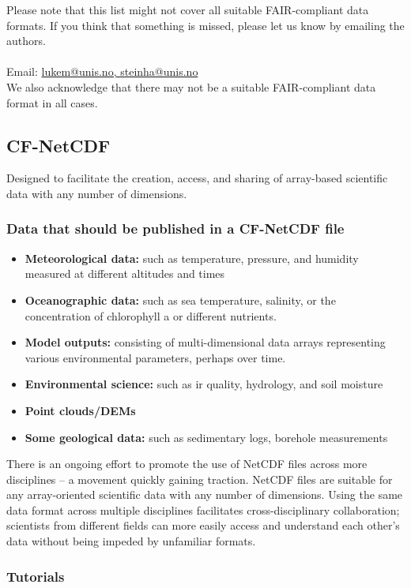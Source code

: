 \documentclass[a4paper,12pt]{article}
\makeatletter
\newcommand{\emailauthors}{\href{mailto:lukem@unis.no,steinha@unis.no}{lukem@unis.no, steinha@unis.no}}
\makeatother
\begin{document}
Please note that this list might not cover all suitable FAIR-compliant data formats. If you think that something is missed, please let us know by emailing the authors.\\ \\
Email: \emailauthors  \\

We also acknowledge that there may not be a suitable FAIR-compliant data format in all cases.

\subsection{CF-NetCDF}

Designed to facilitate the creation, access, and sharing of array-based scientific data with any number of dimensions.

\subsubsection{Data that should be published in a CF-NetCDF file}
\begin{itemize}
\item \textbf{Meteorological data:} such as temperature, pressure, and humidity measured at different altitudes and times
\item \textbf{Oceanographic data:} such as sea temperature, salinity, or the concentration of chlorophyll a or different nutrients.
\item \textbf{Model outputs:} consisting of multi-dimensional data arrays representing various environmental parameters, perhaps over time.
\item \textbf{Environmental science:} such as ir quality, hydrology, and soil moisture
\item \textbf{Point clouds/DEMs}
\item \textbf{Some geological data:} such as sedimentary logs, borehole measurements
\end{itemize}

There is an ongoing effort to promote the use of NetCDF files across more disciplines – a movement quickly gaining traction. NetCDF files are suitable for any array-oriented scientific data with any number of dimensions. Using the same data format across multiple disciplines facilitates cross-disciplinary collaboration; scientists from different fields can more easily access and understand each other’s data without being impeded by unfamiliar formats.

\subsubsection{Tutorials}
\end{document}
